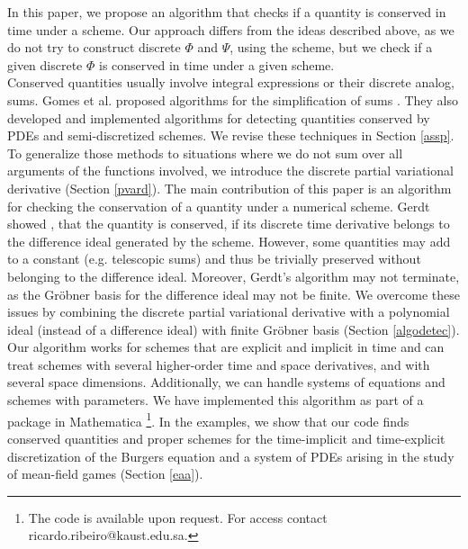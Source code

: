 \documentclass[manuscript]{acmart}
\newcommand{\1}{{\chi}}
\numberwithin{equation}{section}
\theoremstyle{thmlemcorr}
\numberwithin{theorem}{section}
\theoremstyle{thmlemcorr*}
\theoremstyle{defi}
\theoremstyle{remexample}
\theoremstyle{ass}
\begin{document}
In this paper, we propose an algorithm that checks if a quantity is conserved in time under a scheme. Our approach differs from the ideas described above, as we do not try to construct discrete $\Phi$ and $\Psi$, using the scheme, but we check if a given discrete $\Phi$ is conserved in time under a given scheme.\\
Conserved quantities usually involve integral expressions or their discrete analog, sums.
Gomes et al. proposed algorithms for the simplification of sums \cite{gomes20}.
They also developed and implemented algorithms for detecting quantities conserved by PDEs and semi-discretized schemes. 
We revise these techniques in Section \ref{assp}. 
To generalize those methods to situations where we do not sum over all arguments of the functions involved, we introduce the discrete partial variational derivative (Section \ref{pvard}).
The main contribution of this paper is an algorithm for checking the conservation of a quantity under a numerical scheme.
Gerdt showed \cite{gerdt12}, that the quantity is conserved, if its discrete time derivative belongs to the difference ideal generated by the scheme. However, some quantities may add to a constant (e.g. telescopic sums) and thus be trivially preserved without belonging to the difference ideal. Moreover, Gerdt's algorithm may not terminate, as the Gr{\"o}bner basis for the difference ideal may not be finite.
We overcome these issues by combining the discrete partial variational derivative with a polynomial ideal (instead of a difference ideal) with finite Gr{\"o}bner basis (Section \ref{algodetec}). 
Our algorithm works for schemes that are explicit and implicit in time and can treat schemes with several higher-order time  and space derivatives, and with several space dimensions.
Additionally, we can handle systems of equations and schemes with parameters. 
We have implemented this algorithm as part of a package in {\sc Mathematica} \cite{wolfram21} \footnote{The code is available upon request. For access contact ricardo.ribeiro@kaust.edu.sa.}.
In the examples, we show that our code finds conserved quantities and proper schemes for the time-implicit and time-explicit discretization of the Burgers equation and a system of PDEs arising in the study of mean-field games (Section \ref{eaa}).
\end{document}
